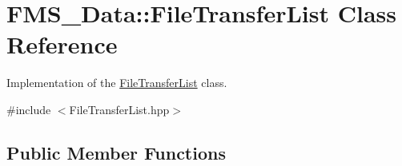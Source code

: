 \hypertarget{classFMS__Data_1_1FileTransferList}{
\section{FMS\_\-Data::FileTransferList Class Reference}
\label{classFMS__Data_1_1FileTransferList}
}


Implementation of the \hyperlink{classFMS__Data_1_1FileTransferList}{FileTransferList} class.  




{\ttfamily \#include $<$FileTransferList.hpp$>$}

\subsection*{Public Member Functions}

